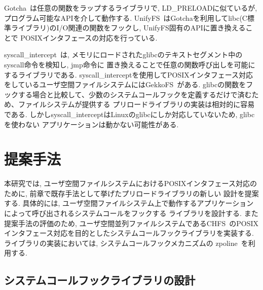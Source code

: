 \documentclass[a4paper,11pt]{jreport}
\begin{document}
Gotcha~\cite{gotcha}は任意の関数をラップするライブラリで, LD\_PRELOADに似ているが, プログラム可能なAPIを介して動作する. 
UnifyFS~\cite{10177390}はGotchaを利用してlibc(C標準ライブラリ)のI/O関連の関数をフックし, UnifyFS固有のAPIに置き換えることで
POSIXインタフェースの対応を行っている.

syscall\_intercept~\cite{syscall-intercept}は, メモリにロードされたglibcのテキストセグメント中のsyscall命令を検知し, jmp命令に
置き換えることで任意の関数呼び出しを可能にするライブラリである.
syscall\_interceptを使用してPOSIXインタフェース対応をしているユーザ空間ファイルシステムにはGekkoFS~\cite{8514892}がある.
glibcの関数をフックする場合と比較して、少数のシステムコールフックを定義するだけで済むため、ファイルシステムが提供する
プリロードライブラリの実装は相対的に容易である. しかしsyscall\_interceptはLinuxのglibcにしか対応していないため, glibcを使わない
アプリケーションは動かない可能性がある.

\chapter{提案手法}
本研究では, ユーザ空間ファイルシステムにおけるPOSIXインタフェース対応のために, 前章で既存手法として挙げたプリロードライブラリの新しい
設計を提案する. 具体的には, ユーザ空間ファイルシステム上で動作するアプリケーションによって呼び出されるシステムコールをフックする
ライブラリを設計する. また提案手法の評価のため, ユーザ空間並列ファイルシステムであるCHFS~\cite{tatebe2022chfs}のPOSIX
インタフェース対応を目的としたシステムコールフックライブラリを実装する. ライブラリの実装においては, システムコールフックメカニズムの
zpoline~\cite{288689}を利用する.


\section{システムコールフックライブラリの設計}
\end{document}
